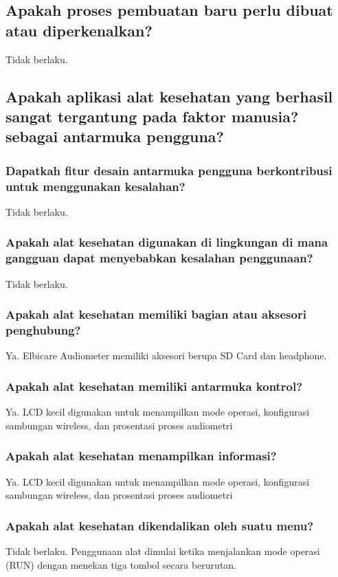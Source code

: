 \documentclass[11pt,a4paper,twoside,draft,onecolumn]{book}
\begin{document}
			\subsection{Apakah proses pembuatan baru perlu dibuat atau diperkenalkan?}
			Tidak berlaku.
			
			\subsection{Apakah aplikasi alat kesehatan yang berhasil sangat tergantung pada faktor manusia? sebagai antarmuka pengguna?}
			
				\subsubsection{Dapatkah fitur desain antarmuka pengguna berkontribusi untuk menggunakan kesalahan?}
				Tidak berlaku.
				
				\subsubsection{Apakah alat kesehatan digunakan di lingkungan di mana gangguan dapat menyebabkan kesalahan penggunaan?}
				Tidak berlaku.
				
				\subsubsection{Apakah alat kesehatan memiliki bagian atau aksesori penghubung?}
				Ya. Elbicare Audiometer memiliki aksesori berupa SD Card dan headphone. 
				
				\subsubsection{Apakah alat kesehatan memiliki antarmuka kontrol?}
				Ya. LCD kecil digunakan untuk menampilkan mode operasi, konfigurasi sambungan wireless, dan prosentasi proses audiometri
				
				\subsubsection{Apakah alat kesehatan menampilkan informasi?}
				Ya. LCD kecil digunakan untuk menampilkan mode operasi, konfigurasi sambungan wireless, dan prosentasi proses audiometri
				
				\subsubsection{Apakah alat kesehatan dikendalikan oleh suatu menu?}
				Tidak berlaku. Penggunaan alat dimulai ketika menjalankan mode operasi (RUN) dengan menekan tiga tombol secara berurutan. 
				
\end{document}
